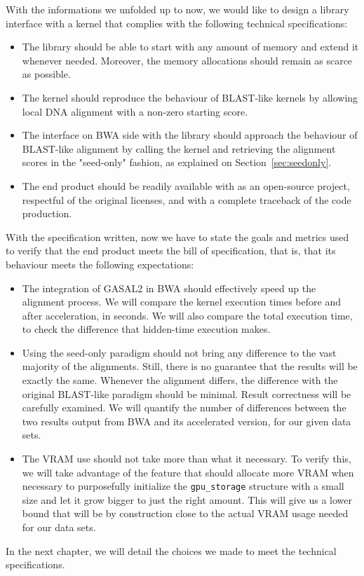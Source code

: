 With the informations we unfolded up to now, we would like to design a library interface with a kernel that complies with the following technical specifications:

\begin{itemize}
	\item The library should be able to start with any amount of memory and extend it whenever needed. Moreover, the memory allocations should remain as scarce as possible.
	\item The kernel should reproduce the behaviour of BLAST-like kernels by allowing local DNA alignment with a non-zero starting score.
	\item The interface on BWA side with the library should approach the behaviour of BLAST-like alignment by calling the kernel and retrieving the alignment scores in the "seed-only" fashion, as explained on Section~\ref{sec:seedonly}.
	\item The end product should be readily available with as an open-source project, respectful of the original licenses, and with a complete traceback of the code production.
\end{itemize}

With the specification written, now we have to state the goals and metrics used to verify that the end product meets the bill of specification, that is, that its behaviour meets the following expectations: 

\begin{itemize}
	\item The integration of GASAL2 in BWA should effectively speed up the alignment process. We will compare the kernel execution times before and after acceleration, in seconds. We will also compare the total execution time, to check the difference that hidden-time execution makes.
	
	\item Using the seed-only paradigm should not bring any difference to the vast majority of the alignments. Still, there is no guarantee that the results will be exactly the same. Whenever the alignment differs, the difference with the original BLAST-like paradigm should be minimal. Result correctness will be carefully examined. We will quantify the number of differences between the two results output from BWA and its accelerated version, for our given data sets.
	
	\item The VRAM use should not take more than what it necessary. To verify this, we will take advantage of the feature that should allocate more VRAM when necessary to purposefully initialize the \verb|gpu_storage| structure with a small size and let it grow bigger to just the right amount. This will give us a lower bound that will be by construction close to the actual VRAM usage needed for our data sets.
	
\end{itemize}

In the next chapter, we will detail the choices we made to meet the technical specifications.